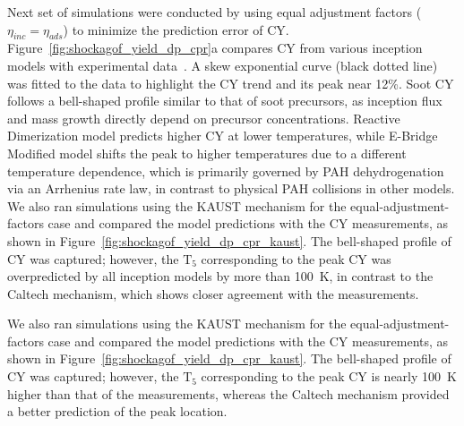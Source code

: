 Next set of simulations were conducted by using equal adjustment factors ($\eta_{inc}=\eta_{ads}$) to minimize the prediction error of CY. Figure~\ref{fig:shockagof_yield_dp_cpr}a compares CY from various inception models with experimental data~\citep{agafonov2016unified}. A skew exponential curve (black dotted line) was fitted to the data to highlight the CY trend and its peak near 12\%. Soot CY follows a bell-shaped profile similar to that of soot precursors, as inception flux and mass growth directly depend on precursor concentrations. Reactive Dimerization model predicts higher CY at lower temperatures, while E-Bridge Modified model shifts the peak to higher temperatures due to a different temperature dependence, which is primarily governed by PAH dehydrogenation via an Arrhenius rate law, in contrast to physical PAH collisions in other models. We also ran simulations using the KAUST mechanism for the equal-adjustment-factors case and compared the model predictions with the CY measurements, as shown in Figure~\ref{fig:shockagof_yield_dp_cpr_kaust}. The bell-shaped profile of CY was captured; however, the $\mathrm{T_5}$ corresponding to the peak CY was overpredicted by all inception models by more than 100~K, in contrast to the Caltech mechanism, which shows closer agreement with the measurements.


We also ran simulations using the KAUST mechanism for the equal-adjustment-factors case and compared the model predictions with the CY measurements, as shown in Figure~\ref{fig:shockagof_yield_dp_cpr_kaust}. The bell-shaped profile of CY was captured; however, the $\mathrm{T_5}$ corresponding to the peak CY is nearly 100~K higher than that of the measurements, whereas the Caltech mechanism provided a better prediction of the peak location.



